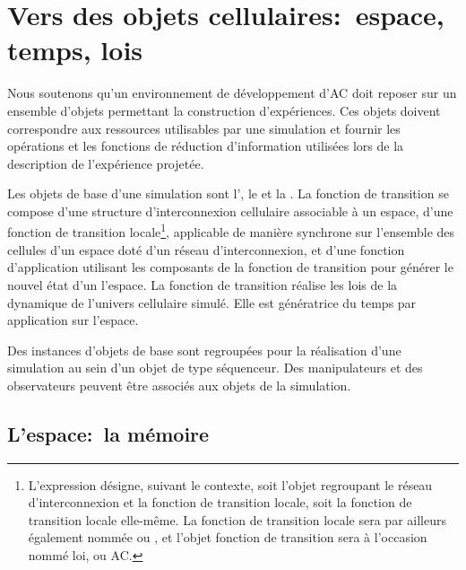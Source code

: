 %
%
\chapter[Espace, temps, lois]{Vers des objets cellulaires:~espace, temps, lois}

Nous soutenons qu'un environnement de d\'eveloppement d'AC doit reposer
sur un ensemble d'objets permettant la construction d'exp\'eriences. %
Ces objets doivent correspondre aux ressources utilisables par une
simulation et fournir les op\'erations et les fonctions de r\'eduction
d'information utilis\'ees lors de la description de l'exp\'erience
projet\'ee. %

Les objets de base d'une simulation sont l', %
le  et la . %
La fonction de transition se compose d'une structure d'interconnexion
cellulaire associable \`a un espace, d'une fonction de transition
locale\footnote{%
  L'expression  d\'esigne, suivant le
  contexte, soit l'objet regroupant le r\'eseau d'interconnexion et la
  fonction de transition locale, soit la fonction de transition locale
  elle-m\^eme. %
  La fonction de transition locale sera par ailleurs \'egalement nomm\'ee
   ou , et l'objet fonction
  de transition sera \`a l'occasion nomm\'e loi, ou AC.}, %
applicable de mani\`ere synchrone sur l'ensemble des cellules d'un
espace dot\'e d'un r\'eseau d'interconnexion, et d'une fonction
d'application utilisant les composants de la
fonction de transition pour g\'en\'erer le nouvel \'etat d'un l'espace. %
La fonction de transition r\'ealise les lois de la dynamique de
l'univers cellulaire simul\'e. %
Elle est g\'en\'eratrice du temps par application sur l'espace. %

Des instances d'objets de base sont regroup\'ees pour la r\'ealisation
d'une simulation au sein d'un objet de type s\'equenceur. %
Des manipulateurs et des observateurs peuvent \^etre associ\'es aux objets
de la simulation. %

\section{L'espace:~la m\'emoire}

